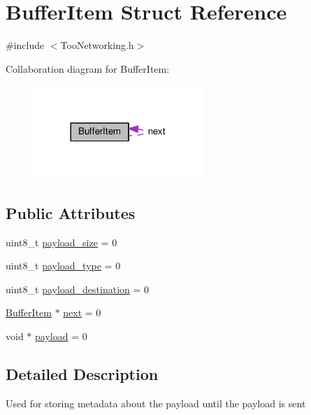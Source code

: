 \hypertarget{structBufferItem}{}\section{Buffer\+Item Struct Reference}
\label{structBufferItem}


{\ttfamily \#include $<$Too\+Networking.\+h$>$}



Collaboration diagram for Buffer\+Item\+:
\nopagebreak
\begin{figure}[H]
\begin{center}
\leavevmode
\includegraphics[width=182pt]{structBufferItem__coll__graph}
\end{center}
\end{figure}
\subsection*{Public Attributes}
\begin{DoxyCompactItemize}
\item 
uint8\+\_\+t \hyperlink{structBufferItem_a5c3187c383ceec1825964d5e512273de}{payload\+\_\+size} = 0
\item 
uint8\+\_\+t \hyperlink{structBufferItem_a3d7529f54e1e8ffaa3ee3b85ae0ebbbd}{payload\+\_\+type} = 0
\item 
uint8\+\_\+t \hyperlink{structBufferItem_a2e475a18a6671f1f0c4bf3010d7a6e89}{payload\+\_\+destination} = 0
\item 
\hyperlink{structBufferItem}{Buffer\+Item} $\ast$ \hyperlink{structBufferItem_a0b7574f1fee48cbb04176af01f9d810f}{next} = 0
\item 
void $\ast$ \hyperlink{structBufferItem_a0ec6d94d7df8c1e9db526fa0200267bb}{payload} = 0
\end{DoxyCompactItemize}


\subsection{Detailed Description}
Used for storing metadata about the payload until the payload is sent 

